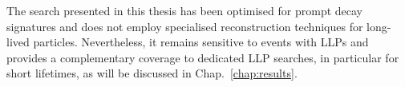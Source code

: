 The search presented in this thesis has been optimised for prompt decay 
signatures and does not employ specialised reconstruction techniques for 
long-lived particles. Nevertheless, it remains sensitive to events with LLPs 
and provides a complementary coverage to dedicated LLP searches, in particular 
for short lifetimes, as will be discussed in Chap.~\ref{chap:results}.




